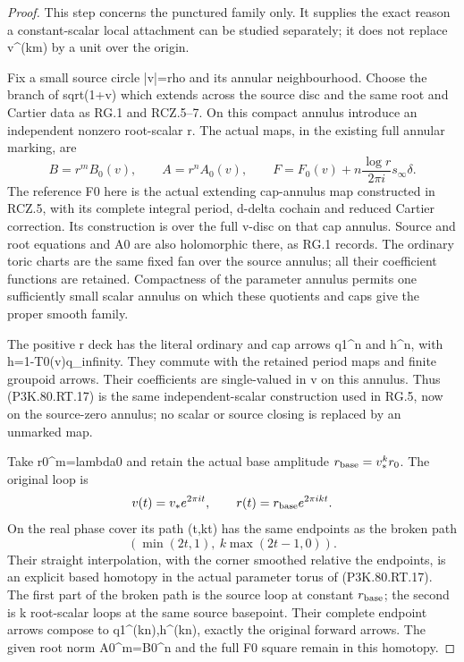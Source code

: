\begin{proof}
This step concerns the punctured family only. It supplies the exact
reason a constant-scalar local attachment can be studied separately;
it does not replace v\textasciicircum{}(km) by a unit over the origin.

Fix a small source circle |v|=rho and its annular neighbourhood. Choose
the branch of sqrt(1+v) which extends across the source disc and the
same root and Cartier data as RG.1 and RCZ.5--7. On this compact
annulus introduce an independent nonzero root-scalar r. The actual
maps, in the existing full annular marking, are
\[
 B=r^mB_0(v),\qquad A=r^nA_0(v),\qquad
 F=F_0(v)+n\frac{\log r}{2\pi i}s_\infty\delta.
                                                        \tag{P3K.80.RT.17}
\]
The reference F0 here is the actual extending cap-annulus map
constructed in RCZ.5, with its complete integral period, d-delta
cochain and reduced Cartier correction. Its construction is over
the full v-disc on that cap annulus. Source and root equations and
A0 are also holomorphic there, as RG.1 records. The ordinary toric
charts are the same fixed fan over the source annulus; all their
coefficient functions are retained. Compactness of the parameter
annulus permits one sufficiently small scalar annulus on which
these quotients and caps give the proper smooth family.

The positive r deck has the literal ordinary and cap arrows
q1\textasciicircum{}n and h\textasciicircum{}n, with h=1-T0(v)q\_infinity. They commute with the
retained period maps and finite groupoid arrows. Their coefficients
are single-valued in v on this annulus. Thus (P3K.80.RT.17) is the same
independent-scalar construction used in RG.5, now on the source-zero
annulus; no scalar or source closing is replaced by an unmarked map.

Take r0\textasciicircum{}m=lambda0 and retain the actual base amplitude \(r_{\rm base}=v_*^k r_0\). The original loop is
\[
 v(t)=v_*e^{2\pi it},\qquad r(t)=r_{\rm base}e^{2\pi ikt}.
\]
On the real phase cover its path (t,kt) has the same endpoints as
the broken path
\[
 (\min(2t,1),\ k\max(2t-1,0)).
\]
Their straight interpolation, with the corner smoothed relative
the endpoints, is an explicit based homotopy in the actual parameter
torus of (P3K.80.RT.17). The first part of the broken path is the source
loop at constant \(r_{\rm base}\); the second is k root-scalar loops at the same
source basepoint. Their complete endpoint arrows compose to
q1\textasciicircum{}(kn),h\textasciicircum{}(kn), exactly the original forward arrows. The given root
norm A0\textasciicircum{}m=B0\textasciicircum{}n and the full F0 square remain in this homotopy.


\end{proof}
